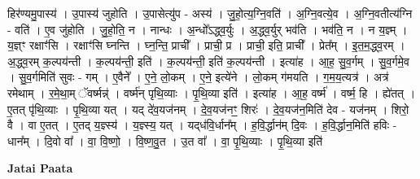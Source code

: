 \documentclass[17pt]{extarticle}
\begin{document}
हिर॑ण्यमु॒पास्य॑ । उ॒पास्य॑ जुहोति । उ॒पासेत्यु॑प - अस्य॑ । जु॒हो॒त्य॒ग्नि॒वति॑ । अ॒ग्नि॒वत्ये॒व । अ॒ग्नि॒वतीत्य॑ग्नि - वति॑ । ए॒व जु॑होति । जु॒हो॒ति॒ न । नान्धः । अ॒न्धो᳚ऽद्ध्व॒र्युः । अ॒द्ध्व॒र्युर् भव॑ति । भव॑ति॒ न । न य॒ज्ञ्म् । य॒ज्ञ्ꣳ रक्षाꣳ॑सि । रक्षाꣳ॑सि घ्नन्ति । घ्न॒न्ति॒ प्राची᳚ । प्राची॒ प्र । प्राची॒ इति॒ प्राची᳚ । प्रेत᳚म् । इ॒त॒म॒द्ध्व॒रम् । अ॒द्ध्व॒रम् क॒ल्पय॑न्ती । क॒ल्पय॑न्ती॒ इति॑ । क॒ल्पय॑न्ती॒ इति॑ क॒ल्पय॑न्ती । इत्या॑ह । आ॒ह॒ सु॒व॒र्गम् । सु॒व॒र्गमे॒व । सु॒व॒र्गमिति॑ सुवः - गम् । ए॒वैने᳚ । ए॒ने॒ लो॒कम् । ए॒ने॒ इत्ये॑ने । लो॒कम् ग॑मयति । ग॒म॒य॒त्यत्र॑ । अत्र॑ रमेथाम् । र॒मे॒था॒म् ॅवर्ष्मन्न्॑ । वर्ष्म॑न् पृथि॒व्याः । पृ॒थि॒व्या इति॑ । इत्या॑ह । आ॒ह॒ वर्ष्म॑ । वर्ष्म॒ हि । ह्ये॑तत् । ए॒तत् पृ॑थि॒व्याः । पृ॒थि॒व्या यत् । यद् दे॑व॒यज॑नम् । दे॒व॒यज॑नꣳ॒॒ शिरः॑ । दे॒व॒यज॑न॒मिति॑ देव - यज॑नम् । शिरो॒ वै । वा ए॒तत् । ए॒तद् य॒ज्ञ्स्य॑ । य॒ज्ञ्स्य॒ यत् । यद्‍ध॑वि॒र्धान᳚म् । ह॒वि॒र्द्धान॑म् दि॒वः । ह॒वि॒र्द्धान॒मिति॑ हविः - धान᳚म् । दि॒वो वा᳚ । वा॒ वि॒ष्णो॒ । वि॒ष्ण॒वु॒त । उ॒त वा᳚ । वा॒ पृ॒थि॒व्याः । पृ॒थि॒व्या इति॑ \newline

\textbf{Jatai Paata} \newline
\end{document}
